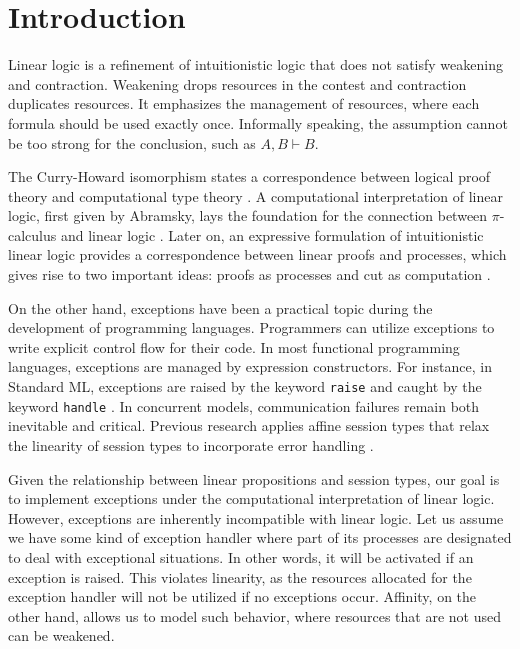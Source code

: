 \documentclass[12pt, openany]{memoir}
\begin{document}
\mainmatter

\chapter{Introduction}

Linear logic \cite{Girard1987} is a refinement of intuitionistic logic that does not satisfy weakening and contraction. 
Weakening drops resources in the contest and contraction duplicates resources. 
It emphasizes the management of resources, where each formula should be used exactly once. 
Informally speaking, the assumption cannot be too strong for the conclusion, such as $A, B \vdash B$.

The Curry-Howard isomorphism states a correspondence between logical proof theory and computational type theory \cite{Howard1980}.
A computational interpretation of linear logic, first given by Abramsky, lays the foundation for the connection between $\pi$-calculus and linear logic \cite{Abramsky1933}. 
Later on, an expressive formulation of intuitionistic linear logic provides a correspondence between linear proofs and processes, 
which gives rise to two important ideas: proofs as processes \cite{Abramsky1994} and cut as computation \cite{Caires2014}.

On the other hand, exceptions have been a practical topic during the development of programming languages.
Programmers can utilize exceptions to write explicit control flow for their code. In most functional programming languages, exceptions are managed by expression constructors. 
For instance, in Standard ML, exceptions are raised by the keyword \texttt{raise} and caught by the keyword \texttt{handle} \cite{Milner1997}. 
In concurrent models, communication failures remain both inevitable and critical. 
Previous research applies affine session types that relax the linearity of session types to incorporate error handling \cite{Mos2014}.

Given the relationship between linear propositions and session types, our goal is to implement exceptions under the computational interpretation of linear logic.
However, exceptions are inherently incompatible with linear logic. 
Let us assume we have some kind of exception handler where part of its processes are designated to deal with exceptional situations. 
In other words, it will be activated if an exception is raised. 
This violates linearity, as the resources allocated for the exception handler will not be utilized if no exceptions occur. 
Affinity, on the other hand, allows us to model such behavior, where resources that are not used can be weakened.
\end{document}
